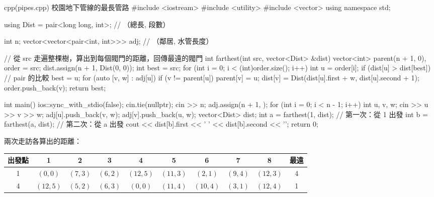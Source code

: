 \begin{example}[label=ex:pipes]{cpp}{(pipes.cpp) 校園地下管線的最長管路}
#include <iostream>
#include <utility>
#include <vector>
using namespace std;

using Dist = pair<long long, int>;          // （總長, 段數）

int n;
vector<vector<pair<int, int>>> adj;         // （鄰居, 水管長度）

// 從 src 走遍整棵樹，算出到每個閥門的距離，回傳最遠的閥門
int farthest(int src, vector<Dist> &dist) {
    vector<int> parent(n + 1, 0), order = {src};
    dist.assign(n + 1, Dist(0, 0));
    int best = src;
    for (int i = 0; i < (int)order.size(); i++) {
        int u = order[i];
        if (dist[u] > dist[best]) {         // pair 的比較
            best = u;
        }
        for (auto [v, w] : adj[u]) {
            if (v != parent[u]) {
                parent[v] = u;
                dist[v] = Dist(dist[u].first + w, dist[u].second + 1);
                order.push_back(v);
            }
        }
    }
    return best;
}

int main() {
    ios::sync_with_stdio(false);
    cin.tie(nullptr);
    cin >> n;
    adj.assign(n + 1, {});
    for (int i = 0; i < n - 1; i++) {
        int u, v, w;
        cin >> u >> v >> w;
        adj[u].push_back({v, w});
        adj[v].push_back({u, w});
    }
    vector<Dist> dist;
    int a = farthest(1, dist);              // 第一次：從 1 出發
    int b = farthest(a, dist);              // 第二次：從 a 出發
    cout << dist[b].first << ' ' << dist[b].second << '\n';
    return 0;
}
\end{example}


兩次走訪各算出的距離：

\begin{center}
\begin{tabular}{c|cccccccc|c}
\toprule
出發點 & 1 & 2 & 3 & 4 & 5 & 6 & 7 & 8 & 最遠 \\
\midrule
1 & $(0,0)$ & $(7,3)$ & $(6,2)$ & $(12,5)$ & $(11,3)$ & $(2,1)$ & $(9,4)$ & $(12,3)$ & 4 \\
4 & $(12,5)$ & $(5,2)$ & $(6,3)$ & $(0,0)$ & $(11,4)$ & $(10,4)$ & $(3,1)$ & $(12,4)$ & 1 \\
\bottomrule
\end{tabular}
\end{center}


